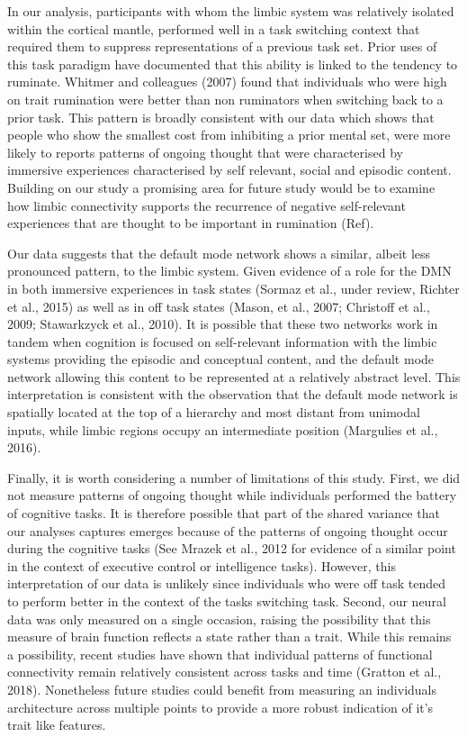 In our analysis, participants with whom the limbic system was relatively isolated within the cortical mantle, performed well in a task switching context that required them to suppress representations of a previous task set. Prior uses of this task paradigm have documented that this ability is linked to the tendency to ruminate. Whitmer and colleagues (2007) found that individuals who were high on trait rumination were better than non ruminators when switching back to a prior task. This pattern is broadly consistent with our data which shows that people who show the smallest cost from inhibiting a prior mental set, were more likely to reports patterns of ongoing thought that were characterised by immersive experiences characterised by self relevant, social and episodic content. Building on our study a promising area for future study would be to examine how limbic connectivity supports the recurrence of negative self-relevant experiences that are thought to be important in rumination (Ref). 

Our data suggests that the default mode network shows a similar, albeit less pronounced pattern, to the limbic system. Given evidence of a role for the DMN in both immersive experiences in task states (Sormaz et al., under review, Richter et al., 2015) as well as in off task states (Mason, et al., 2007; Christoff et al., 2009; Stawarkzyck et al., 2010). It is possible that these two networks work in tandem when cognition is focused on self-relevant information with the limbic systems providing the episodic and conceptual content, and the default mode network allowing this content to be represented at a relatively abstract level. This interpretation is consistent with the observation that the default mode network is spatially located at the top of a hierarchy and most distant from unimodal inputs, while limbic regions occupy an intermediate position (Margulies et al., 2016). 

Finally, it is worth considering a number of limitations of this study. First, we did not measure patterns of ongoing thought while individuals performed the battery of cognitive tasks. It is therefore possible that part of the shared variance that our analyses captures emerges because of the patterns of ongoing thought occur during the cognitive tasks (See Mrazek et al., 2012 for evidence of a similar point in the context of executive control or intelligence tasks). However, this interpretation of our data is unlikely since individuals who were off task tended to perform better in the context of the tasks switching task. Second, our neural data was only measured on a single occasion, raising the possibility that this measure of brain function reflects a state rather than a trait. While this remains a possibility, recent studies have shown that individual patterns of functional connectivity remain relatively consistent across tasks and time (Gratton et al., 2018). Nonetheless future studies could benefit from measuring an individuals architecture across multiple points to provide a more robust indication of it’s trait like features. 
